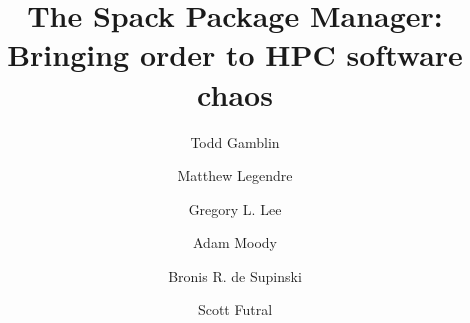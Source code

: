 \documentclass{sig-alternate}
\begin{document}
\title{The Spack Package Manager:\\
Bringing order to HPC software chaos}
\author{
\alignauthor Todd Gamblin\\
\and
\alignauthor Matthew Legendre\\
\and
\alignauthor Gregory L. Lee\\
\and
\alignauthor Adam Moody\\
\and
\alignauthor Bronis R. de Supinski\\
\and
\alignauthor Scott Futral\\
\and\\
%
}
\maketitle

\begin{abstract}
	
\end{abstract}


\newpage









\end{document}

